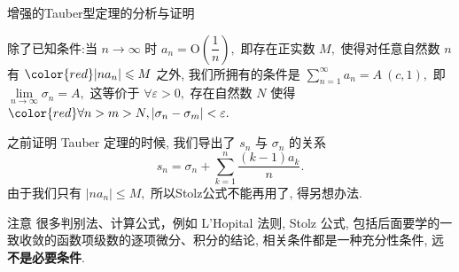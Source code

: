 
\begin{frame}{增强的Tauber型定理的分析与证明}

除了已知条件:当 $n\to\infty$ 时 $a_n = \mathrm{O} \left( \dfrac{1}{n} \right),$ 即存在正实数 $M,$ 使得对任意自然数 $n$ 有 ${\color{red} \rvert n a_n \rvert \leqslant M}$ 之外, 我们所拥有的条件是 $\sum\limits_{n=1}^{\infty} a_n = A~(c, 1),$ 即 $\lim\limits_{n\to\infty} \sigma_n = A,$ 这等价于 $\forall \varepsilon > 0,$ 存在自然数 $N$ 使得 ${\color{red} \forall n > m > N, \lvert \sigma_n - \sigma_m \vert < \varepsilon}.$

\pause
\vspace*{1em}

之前证明 Tauber 定理的时候, 我们导出了 $s_n$ 与 $\sigma_n$ 的关系
$$s_n = \sigma_n + \sum\limits_{k = 1}^n \dfrac{(k-1)a_k}{n}.$$
由于我们只有 $\rvert n a_n \rvert \leqslant M,$ 所以Stolz公式不能再用了, 得另想办法.

\pause
\vspace*{1em}

\begin{block}{注意}
很多判别法、计算公式，例如 L'Hopital 法则, Stolz 公式, 包括后面要学的一致收敛的函数项级数的逐项微分、积分的结论, 相关条件都是一种充分性条件, 远\textbf{\color{red}不是必要条件}.
\end{block}

\end{frame}


